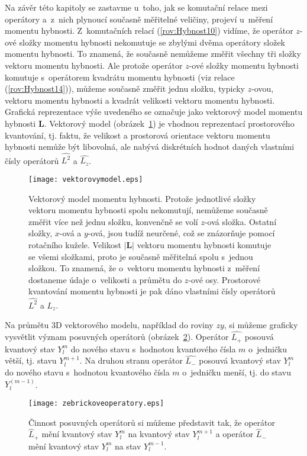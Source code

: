 Na závěr této kapitoly se zastavme u~toho, jak se komutační relace mezi operátory a~z~nich plynoucí současně měřitelné veličiny, projeví u~měření momentu hybnosti. Z~komutačních relací (\ref{rov:Hybnost10}) vidíme, že operátor $z$-ové složky momentu hybnosti nekomutuje se zbylými dvěma operátory složek momentu hybnosti. To znamená, že současně nemůžeme změřit všechny tři složky vektoru momentu hybnosti. Ale protože operátor $z$-ové složky momentu hybnosti komutuje s~operátorem kvadrátu momentu hybnosti (viz relace (\ref{rov:Hybnost14})), můžeme současně změřit  jednu složku, typicky $z$-ovou, vektoru momentu hybnosti a kvadrát velikosti vektoru momentu hybnosti. Grafická reprezentace výše uvedeného se označuje jako vektorový model momentu hybnosti $\mathbf{L}$. Vektorový model (obrázek~\ref{obr:VektorovyModel}) je vhodnou reprezentací prostorového kvantování, tj. faktu, že velikost a prostorová orientace vektoru momentu hybnosti nemůže být libovolná, ale nabývá diskrétních hodnot daných vlastními čísly operátorů $\hat{L^2}$ a $\hat{L_z}$.
\begin{figure} [!ht]
\centering
\texttt{[image: vektorovymodel.eps]}
\caption[Vektorový model momentu hybnosti]{Vektorový model momentu hybnosti. Protože jednotlivé složky vektoru momentu hybnosti spolu nekomutují, nemůžeme současně změřit více než jednu složku, konvenčně se volí $z$-ová složka. Ostatní složky, $x$-ová a $y$-ová, jsou tudíž neurčené, což se znázorňuje pomocí rotačního kužele. Velikost $|\mathbf{L}|$ vektoru momentu hybnosti komutuje se všemi složkami, proto je současně měřitelná spolu s~jednou složkou. To znamená, že o~vektoru momentu hybnosti z~měření dostaneme údaje o~velikosti a průmětu do $z$-ové osy. Prostorové kvantování momentu hybnosti je pak dáno vlastními čísly operátorů $\hat{L^2}$ a $\hat{L_z}$.}
\label{obr:VektorovyModel}
\end{figure}

Na průmětu 3D vektorového modelu, například do roviny $zy$, si můžeme graficky vysvětlit význam posuvných operátorů (obrázek~\ref{obr:ZebrickoveOperatory}). Operátor $\hat{L_+}$ posouvá kvantový stav $Y_l^m$ do nového stavu s~hodnotou kvantového čísla $m$ o~jedničku větší, tj. stavu $Y_l^{m+1}$. Na druhou stranu operátor  $\hat{L_-}$ posouvá kvantový stav $Y_l^m$ do nového stavu s~hodnotou kvantového čísla $m$ o~jedničku menší, tj. do stavu $Y_l^{(m-1)}$.
\begin{figure} [!ht]
\centering
\texttt{[image: zebrickoveoperatory.eps]}
\caption[Posuvné operátory ve vektorovém modelu]{Činnost posuvných operátorů si můžeme představit tak, že operátor $\hat{L}_{+}$ mění kvantový stav $Y_l^m$ na kvantový stav $Y_l^{m+1}$ a operátor $\hat{L}_{-}$ mění kvantový stav $Y_l^m$ na stav $Y_l^{m-1}$.}
\label{obr:ZebrickoveOperatory}
\end{figure}

